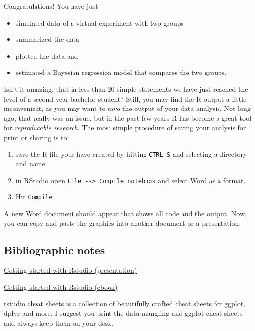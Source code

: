 \documentclass[]{svmono}
\providecommand{\tightlist}{%
  \setlength{\itemsep}{0pt}\setlength{\parskip}{0pt}}
\theoremstyle{definition}
\theoremstyle{definition}
\theoremstyle{definition}
\theoremstyle{remark}
\begin{document}
Congratulations! You have just

\begin{itemize}
\tightlist
\item
  simulated data of a virtual experiment with two groups
\item
  summarized the data
\item
  plotted the data and
\item
  estimated a Bayesian regression model that compares the two groups.
\end{itemize}

Isn't it amazing, that in less than 20 simple statements we have just
reached the level of a second-year bachelor student? Still, you may find
the R output a little inconvenient, as you may want to save the output
of your data analysis. Not long ago, that really was an issue, but in
the past few years R has become a great tool for \emph{reproducable
research}. The most simple procedure of saving your analysis for print
or sharing is to:

\begin{enumerate}
\def\labelenumi{\arabic{enumi}.}
\tightlist
\item
  save the R file your have created by hitting \texttt{CTRL-S} and
  selecting a directory and name.
\item
  in RStudio open \texttt{File\ -\/-\textgreater{}\ Compile\ notebook}
  and select Word as a format.
\item
  Hit \texttt{Compile}
\end{enumerate}

A new Word document should appear that shows all code and the output.
Now, you can copy-and-paste the graphics into another document or a
presentation.

\subsection{Bibliographic notes}\label{bibliographic-notes}

\href{http://www.calvin.edu/~rpruim/talks/Rminis/RStartingUp.pdf}{Getting
started with Rstudio (presentation)}

\href{http://it-ebooks.info/book/2253/}{Getting started with Rstudio
(ebook)}

\href{http://www.rstudio.com/resources/cheatsheets/}{rstudio cheat
sheets} is a collection of beautifully crafted cheat sheets for ggplot,
dplyr and more. I suggest you print the data mangling and ggplot cheat
sheets and always keep them on your desk.
\end{document}
